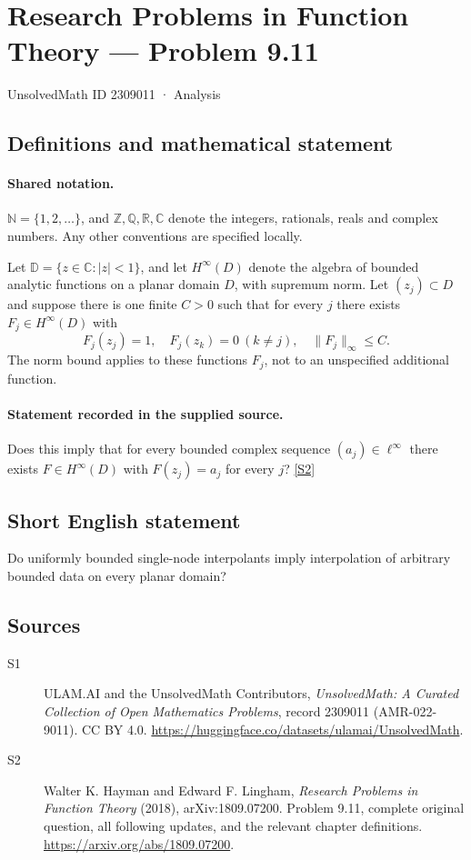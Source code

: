 \documentclass[11pt]{book}
\newcommand{\sref}[2]{\hyperlink{source:#1:#2}{[S#2]}}
\begin{document}
\setcounter{section}{2309010}
\section{Research Problems in Function Theory — Problem 9.11}\label{2309011}
{\small\sffamily UnsolvedMath ID 2309011 · Analysis}
\subsection{Definitions and mathematical statement}

\paragraph{Shared notation.}$\mathbb N=\{1,2,\ldots\}$, and $\mathbb Z,\mathbb Q,\mathbb R,\mathbb C$ denote the integers, rationals, reals and complex numbers. Any other conventions are specified locally.


Let $\mathbb D=\{z\in\mathbb C:|z|<1\}$, and let $H^{\infty}(D)$ denote the algebra of bounded analytic functions on a planar domain $D$, with supremum norm. Let $(z_j)\subset D$ and suppose there is one finite $C>0$ such that for every $j$ there exists $F_j\in H^{\infty}(D)$ with \[F_j(z_j)=1,\quad F_j(z_k)=0\ (k\ne j),\quad\|F_j\|_\infty\le C.\] The norm bound applies to these functions $F_j$, not to an unspecified additional function.
\paragraph{Statement recorded in the supplied source.}
Does this imply that for every bounded complex sequence $(a_j)\in\ell^{\infty}$ there exists $F\in H^{\infty}(D)$ with $F(z_j)=a_j$ for every $j$? \sref{2309011}{2}
\subsection{Short English statement}
Do uniformly bounded single-node interpolants imply interpolation of arbitrary bounded data on every planar domain?
\subsection{Sources}
\begin{description}
\item[\hypertarget{source:2309011:1}{S1}] ULAM.AI and the UnsolvedMath Contributors, \emph{UnsolvedMath: A Curated Collection of Open Mathematics Problems}, record 2309011 (AMR-022-9011). CC BY 4.0. \url{https://huggingface.co/datasets/ulamai/UnsolvedMath}.
\item[\hypertarget{source:2309011:2}{S2}] Walter K. Hayman and Edward F. Lingham, \emph{Research Problems in Function Theory} (2018), arXiv:1809.07200. Problem 9.11, complete original question, all following updates, and the relevant chapter definitions. \url{https://arxiv.org/abs/1809.07200}.
\end{description}
\label{end:2309011}
\end{document}
